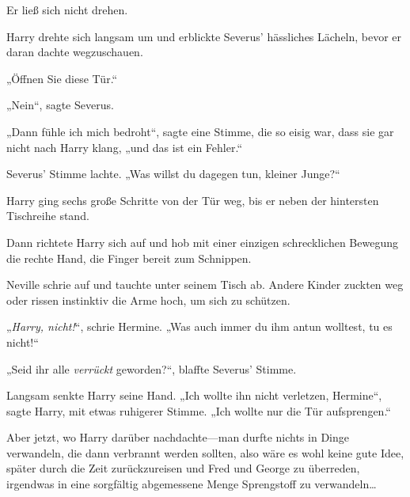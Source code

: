 Er ließ sich nicht drehen.

Harry drehte sich langsam um und erblickte Severus’ hässliches Lächeln, bevor er daran dachte wegzuschauen.

„Öffnen Sie diese Tür.“

„Nein“, sagte Severus.

„Dann fühle ich mich bedroht“, sagte eine Stimme, die so eisig war, dass sie gar nicht nach Harry klang, „und das ist ein Fehler.“

Severus’ Stimme lachte. „Was willst du dagegen tun, kleiner Junge?“

Harry ging sechs große Schritte von der Tür weg, bis er neben der hintersten Tischreihe stand.

Dann richtete Harry sich auf und hob mit einer einzigen schrecklichen Bewegung die rechte Hand, die Finger bereit zum Schnippen.

Neville schrie auf und tauchte unter seinem Tisch ab. Andere Kinder zuckten weg oder rissen instinktiv die Arme hoch, um sich zu schützen.

„\emph{Harry, nicht!}“, schrie Hermine. „Was auch immer du ihm antun wolltest, tu es nicht!“

„Seid ihr alle \emph{verrückt} geworden?“, blaffte Severus’ Stimme.

Langsam senkte Harry seine Hand. „Ich wollte ihn nicht verletzen, Hermine“, sagte Harry, mit etwas ruhigerer Stimme. „Ich wollte nur die Tür aufsprengen.“

Aber jetzt, wo Harry darüber nachdachte—man durfte nichts in Dinge verwandeln, die dann verbrannt werden sollten, also wäre es wohl keine gute Idee, später durch die Zeit zurückzureisen und Fred und George zu überreden, irgendwas in eine sorgfältig abgemessene Menge Sprengstoff zu verwandeln…

